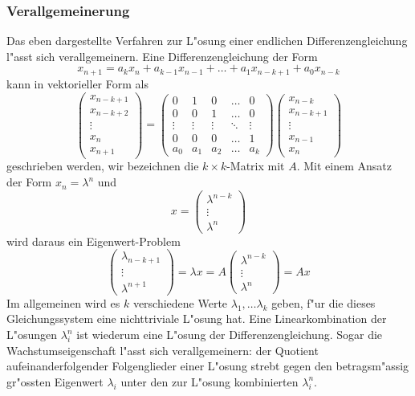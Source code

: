 \subsubsection{Verallgemeinerung}
Das eben dargestellte Verfahren zur L"osung einer endlichen 
Differenzengleichung l"asst sich verallgemeinern.
Eine Differenzengleichung der Form
\[
x_{n+1}=a_kx_n+a_{k-1}x_{n-1}+\dots+a_1x_{n-k+1}+a_0x_{n-k}
\]
kann in vektorieller Form als
\[
\begin{pmatrix}
x_{n-k+1}\\
x_{n-k+2}\\
\vdots\\
x_{n}\\
x_{n+1}
\end{pmatrix}
=
\begin{pmatrix}
0&1&0&\dots&0\\
0&0&1&\dots&0\\
\vdots&\vdots&\vdots&\ddots&\vdots\\
0&0&0&\dots&1\\
a_0&a_1&a_2&\dots&a_k
\end{pmatrix}
\begin{pmatrix}
x_{n-k}\\
x_{n-k+1}\\
\vdots\\
x_{n-1}\\
x_n
\end{pmatrix}
\]
geschrieben werden, wir bezeichnen die $k\times k$-Matrix mit $A$.
Mit einem Ansatz der Form $x_n=\lambda^n$ und
\[
x=
\begin{pmatrix}
\lambda^{n-k}\\
\vdots\\
\lambda^n
\end{pmatrix}
\]
wird daraus ein
Eigenwert-Problem
\[
\begin{pmatrix}
\lambda_{n-k+1}\\
\vdots\\
\lambda^{n+1}
\end{pmatrix}
=
\lambda x
=A
\begin{pmatrix}
\lambda^{n-k}\\
\vdots\\
\lambda^n
\end{pmatrix}
=Ax
\]
Im allgemeinen wird es $k$ verschiedene Werte $\lambda_1,\dots\lambda_k$ geben,
f"ur die dieses Gleichungssystem eine nichttriviale L"osung hat.
Eine Linearkombination der L"osungen $\lambda_i^n$ ist wiederum eine
L"osung der Differenzengleichung.
Sogar die Wachstumseigenschaft l"asst
sich verallgemeinern: der Quotient aufeinanderfolgender Folgenglieder
einer L"osung strebt gegen den betragsm"assig gr"ossten Eigenwert $\lambda_i$
unter den zur L"osung kombinierten $\lambda_i^n$.

